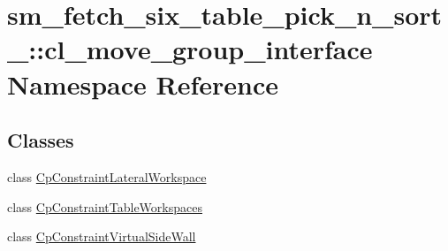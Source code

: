 \hypertarget{namespacesm__fetch__six__table__pick__n__sort__1_1_1cl__move__group__interface}{}\section{sm\+\_\+fetch\+\_\+six\+\_\+table\+\_\+pick\+\_\+n\+\_\+sort\+\_\+:\+:cl\+\_\+move\+\_\+group\+\_\+interface Namespace Reference}
\label{namespacesm__fetch__six__table__pick__n__sort__1_1_1cl__move__group__interface}
\subsection*{Classes}
\begin{DoxyCompactItemize}
\item 
class \hyperlink{classsm__fetch__six__table__pick__n__sort__1_1_1cl__move__group__interface_1_1CpConstraintLateralWorkspace}{Cp\+Constraint\+Lateral\+Workspace}
\item 
class \hyperlink{classsm__fetch__six__table__pick__n__sort__1_1_1cl__move__group__interface_1_1CpConstraintTableWorkspaces}{Cp\+Constraint\+Table\+Workspaces}
\item 
class \hyperlink{classsm__fetch__six__table__pick__n__sort__1_1_1cl__move__group__interface_1_1CpConstraintVirtualSideWall}{Cp\+Constraint\+Virtual\+Side\+Wall}
\end{DoxyCompactItemize}
